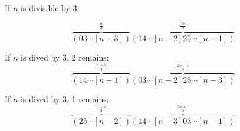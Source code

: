 \documentclass[a4paper,10pt]{article}
\begin{document}
If $n$ is divisible by 3:

\begin{equation}
\overbrace{(03\cdots[n-3])}^{\frac{n}{3}}\overbrace{(14\cdots[n-2]25\cdots[n-1])}^{\frac{2n}{3}}
\end{equation}

If $n$ is dived by 3, 2 remains:
\begin{equation}
\overbrace{(14\cdots[n-1])}^{\frac{n+1}{3}}\overbrace{(03\cdots[n-2]25\cdots[n-3])}^{\frac{2n-1}{3}} 
\end{equation}

If $n$ is dived by 3, 1 remains:
\begin{equation}
\overbrace{(25\cdots[n-2])}^{\frac{n-1}{3}}\overbrace{(14\cdots[n-3]03\cdots[n-1])}^{\frac{2n+1}{3}} 
\end{equation}
\end{document}
